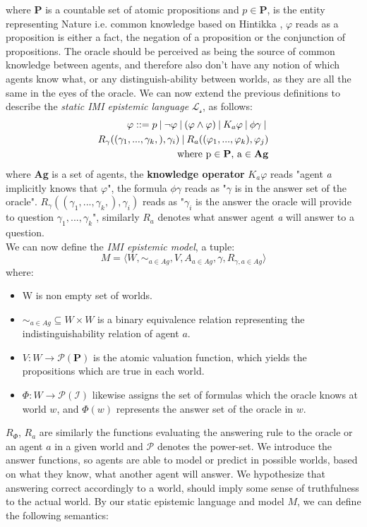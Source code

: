 where \textbf{P} is a countable set of atomic propositions and $p \in
	\mathbf{P}$, \oracle is the entity representing Nature i.e. common knowledge
based on Hintikka \cite{hintikka88}, $\varphi$ reads as a proposition is either
a fact, the negation of a proposition or the conjunction of propositions. The oracle should be perceived as being the source of common knowledge between agents, and therefore also don't have any notion of which agents know what, or any distinguish-ability between worlds, as they are all the same in the eyes of the oracle.
We can now extend the previous definitions to describe the \textit{static IMI
	epistemic language} $\mathscr{L_s}$, as follows:
\begin{align*}
	\varphi ::= p \:|\:\neg\varphi\:|\:(\varphi \land \varphi) \:|\: K_a\varphi \:|\: \phi\gamma \:|\: \\ R_\gamma((\gamma_1,...,\gamma_k,), \gamma_i) \:|\: R_a((\varphi_1,...,\varphi_k), \varphi_j) \\ \text{where p} \in \text{\textbf{P}}\text{, a} \in \text{\textbf{Ag}}
\end{align*}
where \textbf{Ag} is a set of agents, the \textbf{knowledge operator} $K_a\varphi$ reads "agent \textit{a} implicitly knows that $\varphi$", the formula $\phi\gamma$ reads as "$\gamma$ is in the answer set of the oracle". $R_\gamma((\gamma_1,...,\gamma_k,), \gamma_i)$ reads as "$\gamma_i$ is the answer the oracle will provide to question $\gamma_1,...,\gamma_k$", similarly $R_a$ denotes what answer agent \textit{a} will answer to a question. \\

We can now define the \textit{IMI epistemic model}, a tuple:
$$
	M = \langle W, \sim_{a\in Ag}, V, A_{a\in Ag}, \gamma, R_{\gamma,a\in Ag}\rangle
$$
where:
\begin{itemize}
	\setlength\itemsep{-0.4em}
	\item W is non empty set of worlds.
	\item $\sim_{a\in Ag} \subseteq W \times W$ is a binary equivalence relation representing the indistinguishability relation of agent $a$.
	\item $V : W \rightarrow \mathscr{P}(\mathbf{P})$ is the atomic valuation function, which yields the propositions which are true in each world. 
	\item $\Phi : W \rightarrow \mathscr{P}(\mathscr{I}) $ likewise assigns the set of formulas which the oracle knows at world $w$, and $\Phi(w)$ represents the answer set of the oracle in $w$.
\end{itemize}
$R_{\Phi}$, $R_{a}$ are similarly the functions evaluating the answering rule to the oracle or an agent $a$ in a given world and $\mathscr{P}$ denotes the power-set. We introduce the answer functions, so agents are able to model or predict in possible worlds, based on what they know, what another agent will answer. We hypothesize that answering correct accordingly to a world, should imply some sense of truthfulness to the actual world. By our static epistemic language \staticlang and model $M$, we can define the following semantics:

